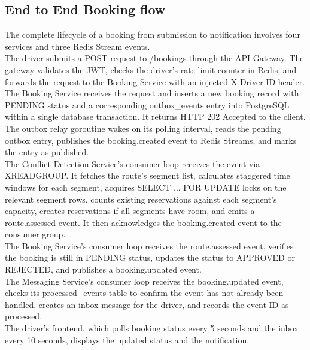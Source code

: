 \documentclass{article}
\begin{document}
\subsection{End to End Booking flow}
The complete lifecycle of a booking from submission to notification involves four services and three Redis Stream events. \\
The driver submits a POST request to /bookings through the API Gateway. The gateway validates the JWT, checks the driver's rate limit counter in Redis, and forwards the request to the Booking Service with an injected X-Driver-ID header. \\
The Booking Service receives the request and inserts a new booking record with PENDING status and a corresponding outbox_events entry into PostgreSQL within a single database transaction. It returns HTTP 202 Accepted to the client. \\
The outbox relay goroutine wakes on its polling interval, reads the pending outbox entry, publishes the booking.created event to Redis Streams, and marks the entry as published. \\
The Conflict Detection Service's consumer loop receives the event via XREADGROUP. It fetches the route's segment list, calculates staggered time windows for each segment, acquires SELECT ... FOR UPDATE locks on the relevant segment rows, counts existing reservations against each segment's capacity, creates reservations if all segments have room, and emits a route.assessed event. It then acknowledges the booking.created event to the consumer group. \\
The Booking Service's consumer loop receives the route.assessed event, verifies the booking is still in PENDING status, updates the status to APPROVED or REJECTED, and publishes a booking.updated event. \\

The Messaging Service's consumer loop receives the booking.updated event, checks its processed_events table to confirm the event has not already been handled, creates an inbox message for the driver, and records the event ID as processed. \\
The driver's frontend, which polls booking status every 5 seconds and the inbox every 10 seconds, displays the updated status and the notification.
\end{document}
